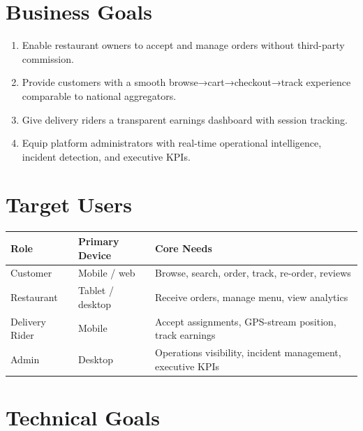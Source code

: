 \documentclass[11pt,a4paper,twoside]{book}
\newcommand{\th}[1]{\textbf{\color{white}#1}}
\begin{document}
\section{Business Goals}

\begin{enumerate}[leftmargin=1.5em]
  \item Enable restaurant owners to accept and manage orders without third-party
        commission.
  \item Provide customers with a smooth browse→cart→checkout→track experience
        comparable to national aggregators.
  \item Give delivery riders a transparent earnings dashboard with session tracking.
  \item Equip platform administrators with real-time operational intelligence,
        incident detection, and executive KPIs.
\end{enumerate}

\section{Target Users}

\begin{center}\small
\begin{tabular}{llp{6.5cm}}
\toprule
\rowcolor{headbg}\th{Role} & \th{Primary Device} & \th{Core Needs} \\
\midrule
Customer        & Mobile / web & Browse, search, order, track, re-order, reviews \\
\rowcolor{rowalt}Restaurant     & Tablet / desktop & Receive orders, manage menu, view analytics \\
Delivery Rider  & Mobile       & Accept assignments, GPS-stream position, track earnings \\
\rowcolor{rowalt}Admin          & Desktop          & Operations visibility, incident management, executive KPIs \\
\bottomrule
\end{tabular}
\end{center}

\section{Technical Goals}
\end{document}
